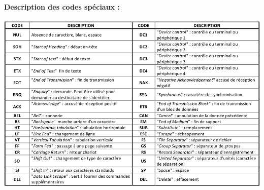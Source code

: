 \documentclass{article}
\begin{document}
\paragraph{Description des codes spéciaux :}
\begin{center}
	\includegraphics[scale=.6]{./figures/ascii2.png}
\end{center}
\end{document}
